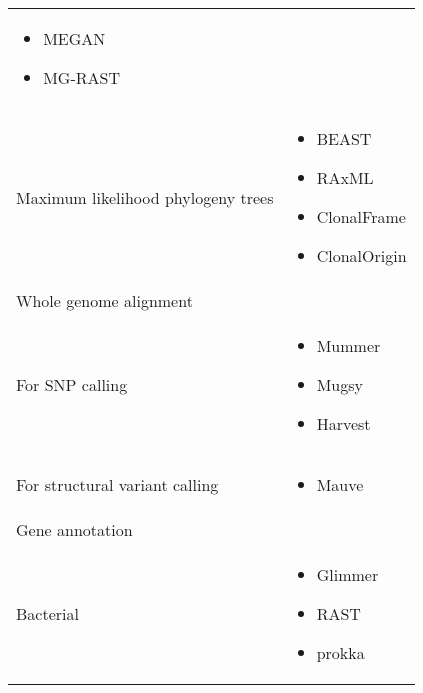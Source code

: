 \begin{table}[ht]
\begin{tabular}{l l}
    \begin{minipage}[t]{5cm}
      \raggedright
      \begin{itemize}[noitemsep]
      \item MEGAN
      \item MG-RAST
      \end{itemize}
      \smallskip
    \end{minipage}
    \\
    Maximum likelihood phylogeny trees &
    \begin{minipage}[t]{5cm}
      \raggedright
      \begin{itemize}[noitemsep]
      \item BEAST
      \item RAxML
      \item ClonalFrame
      \item ClonalOrigin
      \end{itemize}
      \smallskip
    \end{minipage}
    \\
    Whole genome alignment &
    \\
    \-\tabindent For SNP calling &
    \begin{minipage}[t]{5cm}
      \raggedright
      \begin{itemize}[noitemsep]
      \item Mummer
      \item Mugsy
      \item Harvest
      \end{itemize}
      \smallskip
    \end{minipage}
    \\
    \-\tabindent For structural variant calling &
    \begin{minipage}[t]{5cm}
      \raggedright
      \begin{itemize}[noitemsep]
      \item Mauve
      \end{itemize}
      \smallskip
    \end{minipage}
    \\
    Gene annotation &
    \\
    \-\tabindent Bacterial &
    \begin{minipage}[t]{5cm}
      \raggedright
      \begin{itemize}[noitemsep]
      \item Glimmer
      \item RAST
      \item prokka

\end{itemize}
\end{minipage}
\end{tabular}
\end{table}
